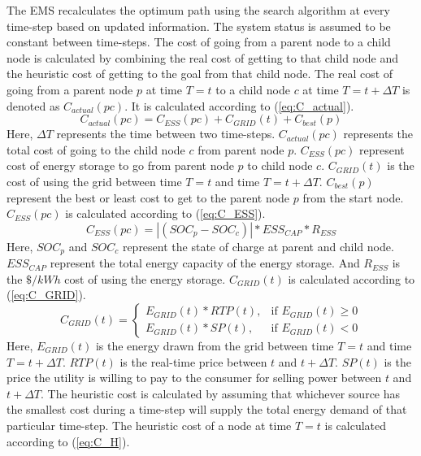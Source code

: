 The EMS recalculates the optimum path using the search algorithm at every time-step based on updated information. The system status is assumed to be constant between time-steps. The cost of going from a parent node to a child node is calculated by combining the real cost of getting to that child node and the heuristic cost of getting to the goal from that child node. The real cost of going from a parent node $p$ at time $T=t$ to a child node $c$ at time $T=t+\Delta T$ is denoted as $C_{actual}(pc)$. It is calculated according to (\ref{eq:C_actual}).
\vspace{-1mm}
\begin{equation}
\label{eq:C_actual}
    C_{actual}(pc) =  C_{ESS}(pc)+C_{GRID}(t)+C_{best}(p)
\end{equation}
\vspace{-1mm}
Here, $\Delta T$ represents the time between two time-steps. $C_{actual}(pc)$ represents the total cost of going to the child node $c$ from parent node $p$. $C_{ESS}(pc)$ represent cost of energy storage to go from parent node $p$ to child node $c$. $C_{GRID}(t)$ is the cost of using the grid between time $T=t$ and time $T=t+\Delta T$. $C_{best}(p)$ represent the best or least cost to get to the parent node $p$ from the start node. $C_{ESS}(pc)$ is calculated according to (\ref{eq:C_ESS}).
\vspace{-1mm}
\begin{equation}
\label{eq:C_ESS}
C_{ESS}(pc) = |(SOC_p - SOC_c)|*ESS_{CAP}*R_{ESS}
\end{equation}
\vspace{-1mm}
Here, $SOC_p$ and $SOC_c$ represent the state of charge at parent and child node. $ESS_{CAP}$ represent the total energy capacity of the energy storage. And $R_{ESS}$ is the $\$/kWh$ cost of using the energy storage. $C_{GRID}(t)$ is calculated according to (\ref{eq:C_GRID}).
\vspace{-1mm}
\begin{equation}
\label{eq:C_GRID}
C_{GRID}(t) = 
\begin{cases}
   E_{GRID}(t)*RTP(t),& \text{if } E_{GRID}(t)\geq 0\\
    E_{GRID}(t)*SP(t),& \text{if }  E_{GRID}(t) < 0
\end{cases}
\end{equation}
\vspace{-1mm}
Here, $E_{GRID}(t)$ is the energy drawn from the grid between time $T=t$ and time $T=t+\Delta T$. $RTP(t)$ is the real-time price between $t$ and $t+\Delta T$. $SP(t)$ is the price the utility is willing to pay to the consumer for selling power between $t$ and $t+\Delta T$. The heuristic cost is calculated by assuming that whichever source has the smallest cost during a time-step will supply the total energy demand of that particular time-step. The heuristic cost of a node at time $T = t$ is calculated according to (\ref{eq:C_H}).

